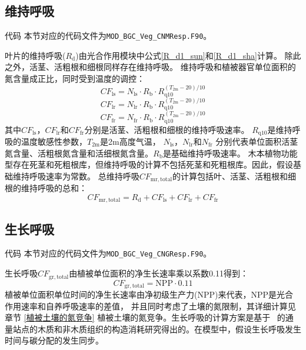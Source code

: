 \subsection{维持呼吸}
\begin{mymdframed}{代码}
  本节对应的代码文件为\texttt{MOD\_BGC\_Veg\_CNMResp.F90}。
\end{mymdframed}
叶片的维持呼吸($R_{\mathrm {d}} $)由光合作用模块中公式\eqref{R_d1_sun}和\eqref{R_d1_sha}计算。
除此之外，活茎、活粗根和细根同样存在维持呼吸。
维持呼吸和植被器官单位面积的氮含量成正比，同时受到温度的调控：
\begin{equation}
  CF_{\mathrm{{ls}}}=N_{\mathrm{{ls }}} \cdot R_{\mathrm{{b }}} \cdot R_{\mathrm{q10}}^{\left(T_{\mathrm {2m}}-20\right) / 10}
\end{equation}
\begin{equation}
  CF_{\mathrm{ {lr }}}=N_{\mathrm{ {lr }}} \cdot R_{\mathrm{ {b }}} \cdot R_{\mathrm{q10}}^{\left(T_{\mathrm {2m}}-20\right) / 10}
\end{equation}
\begin{equation}
  CF_{\mathrm{ {fr }}}=N_{\mathrm{{fr}}} \cdot R_{\mathrm{{b}}} \cdot R_{\mathrm{q10}}^{\left(T_{\mathrm {2m}}-20\right) / 10}
\end{equation}
其中$CF_{\mathrm{ls}}$，$CF_{\mathrm{lr}}$和$CF_{\mathrm{fr}}$分别是活茎、活粗根和细根的维持呼吸速率。
$R_{\mathrm{q10}}$是维持呼吸的温度敏感性参数，$T_{\mathrm {2m}}$是2m高度气温， $N_{\mathrm{ls}}$，$N_{\mathrm{lr}}$和$N_{\mathrm{fr}}$
分别代表单位面积活茎氮含量、活粗根氮含量和活细根氮含量。$R_{\mathrm{b}}$是基础维持呼吸速率。
木本植物功能型存在死茎和死粗根库，但维持呼吸的计算不包括死茎和死粗根库。因此，假设基础维持呼吸速率为常数。
总维持呼吸$CF_{\mathrm{mr,total}}$的计算包括叶、活茎、活粗根和细根的维持呼吸的总和：
\begin{equation}
  CF_{\mathrm{mr,total}}=R_{\mathrm{d}}+CF_{\mathrm{ls}}+CF_{\mathrm{lr}}+CF_{\mathrm{fr}}
\end{equation}
\subsection{生长呼吸}\label{生长呼吸}
\begin{mymdframed}{代码}
  本节对应的代码文件为\texttt{MOD\_BGC\_Veg\_CNGResp.F90}。
\end{mymdframed}
生长呼吸$CF_{\mathrm{gr,total}}$由植被单位面积的净生长速率乘以系数0.11得到：
\begin{equation}
  CF_{\mathrm{gr,total}}=\text{NPP} \cdot 0.11
\end{equation}
植被单位面积单位时间的净生长速率由净初级生产力(${\mathrm {NPP}}$)来代表，${\mathrm {NPP}}$是光合作用速率和自养呼吸速率的差值，
并且同时考虑了土壤的氮限制，其详细计算见章节 \ref{植被土壤的氮竞争} 植被土壤的氮竞争。生长呼吸的计算方案是基于~\citet{atkins2018quantifying}
的通量站点的木质和非木质组织的构造消耗研究得出的。在模型中，假设生长呼吸发生时间与碳分配的发生同步。


